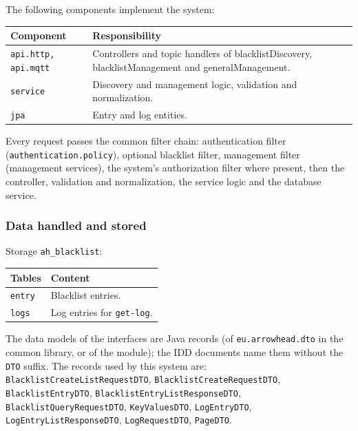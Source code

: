 \documentclass[a4paper]{arrowhead}
\begin{document}
The following components implement the system:

\noindent\begin{longtable}{| p{5.6cm} | p{9.6cm} |} \hline
\rowcolor{gray!33} Component & Responsibility \\ \hline \endhead
\texttt{api.\allowbreak{}http,\allowbreak{} api.\allowbreak{}mqtt} & Controllers and topic handlers of blacklist\allowbreak{}Discovery, blacklist\allowbreak{}Management and generalManagement. \\ \hline
\texttt{service} & Discovery and management logic, validation and normalization. \\ \hline
\texttt{jpa} & Entry and log entities. \\ \hline
\end{longtable}

Every request passes the common filter chain: authentication filter (\texttt{authentication.\allowbreak{}policy}), optional blacklist filter, management filter (management services), the system's authorization filter where present, then the controller, validation and normalization, the service logic and the database service.

\subsubsection{Data handled and stored}

Storage \texttt{ah\_\allowbreak{}blacklist}:

\noindent\begin{longtable}{| p{6.4cm} | p{8.8cm} |} \hline
\rowcolor{gray!33} Tables & Content \\ \hline \endhead
\texttt{entry} & Blacklist entries. \\ \hline
\texttt{logs} & Log entries for \texttt{get-\allowbreak{}log}. \\ \hline
\end{longtable}

The data models of the interfaces are Java records (of \texttt{eu.arrowhead.dto} in the common library, or of the module); the IDD documents name them without the \texttt{DTO} suffix. The records used by this system are: \texttt{Blacklist\allowbreak{}Create\allowbreak{}List\allowbreak{}Request\allowbreak{}DTO}, \texttt{Blacklist\allowbreak{}Create\allowbreak{}Request\allowbreak{}DTO}, \texttt{BlacklistEntryDTO}, \texttt{Blacklist\allowbreak{}Entry\allowbreak{}List\allowbreak{}Response\allowbreak{}DTO}, \texttt{Blacklist\allowbreak{}Query\allowbreak{}Request\allowbreak{}DTO}, \texttt{KeyValuesDTO}, \texttt{LogEntryDTO}, \texttt{Log\allowbreak{}Entry\allowbreak{}List\allowbreak{}Response\allowbreak{}DTO}, \texttt{LogRequestDTO}, \texttt{PageDTO}.
\end{document}
